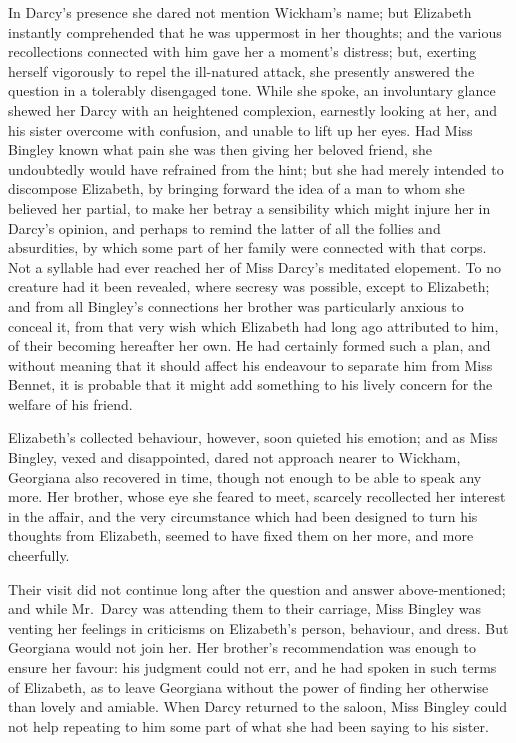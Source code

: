 In Darcy’s presence she dared not mention Wickham’s
name; but Elizabeth instantly comprehended that he was
uppermost in her thoughts; and the various recollections
connected with him gave her a moment’s distress; but,
exerting herself vigorously to repel the ill-natured attack,
she presently answered the question in a tolerably disengaged
tone. While she spoke, an involuntary glance
shewed her Darcy with an heightened complexion, earnestly
looking at her, and his sister overcome with confusion,
and unable to lift up her eyes. Had Miss Bingley known
what pain she was then giving her beloved friend, she
undoubtedly would have refrained from the hint; but she
had merely intended to discompose Elizabeth, by bringing
forward the idea of a man to whom she believed her
partial, to make her betray a sensibility which might
injure her in Darcy’s opinion, and perhaps to remind the
latter of all the follies and absurdities, by which some part
of her family were connected with that corps. Not a
syllable had ever reached her of Miss Darcy’s meditated
elopement. To no creature had it been revealed, where
secresy was possible, except to Elizabeth; and from all
Bingley’s connections her brother was particularly anxious
to conceal it, from that very wish which Elizabeth had
long ago attributed to him, of their becoming hereafter
her own. He had certainly formed such a plan, and
without meaning that it should affect his endeavour to
separate him from Miss Bennet, it is probable that it
might add something to his lively concern for the welfare
of his friend.

Elizabeth’s collected behaviour, however, soon quieted
his emotion; and as Miss Bingley, vexed and disappointed,
dared not approach nearer to Wickham, Georgiana also
recovered in time, though not enough to be able to speak
any more. Her brother, whose eye she feared to meet,
scarcely recollected her interest in the affair, and the very
circumstance which had been designed to turn his thoughts
from Elizabeth, seemed to have fixed them on her more,
and more cheerfully.

Their visit did not continue long after the question
and answer above-mentioned; and while Mr.\ Darcy was
attending them to their carriage, Miss Bingley was venting
her feelings in criticisms on Elizabeth’s person, behaviour,
and dress. But Georgiana would not join her. Her
brother’s recommendation was enough to ensure her
favour: his judgment could not err, and he had spoken
in such terms of Elizabeth, as to leave Georgiana without
the power of finding her otherwise than lovely and amiable.
When Darcy returned to the saloon, Miss Bingley could
not help repeating to him some part of what she had been
saying to his sister.

